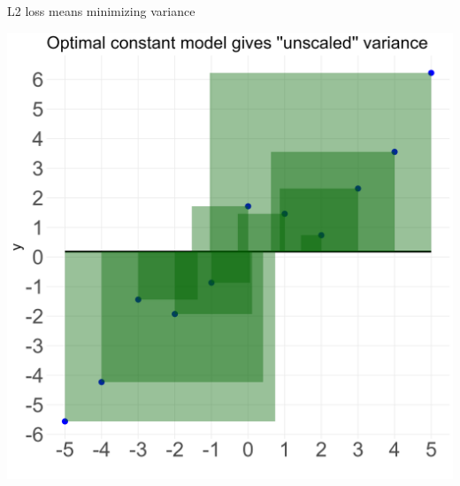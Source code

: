 \documentclass[11pt,compress,t,notes=noshow, xcolor=table]{beamer}
\begin{document}
\begin{vbframe}{L2 loss means minimizing variance}
{}
{
    \includegraphics{figure_man/plot_const_var.png}


}
\end{vbframe}
\end{document}

